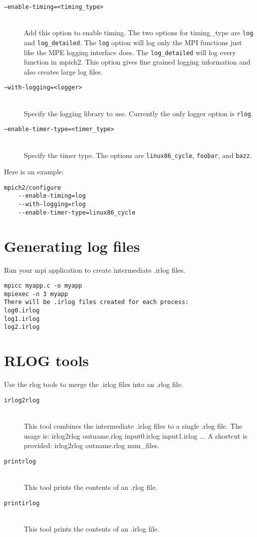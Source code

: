 \documentclass[dvipdfm,11pt]{article}
\begin{document}
\begin{description}
\item[\texttt{--enable-timing=<timing\_type>}]\mbox{}\\
Add this option to enable timing.  The two options for timing\_type are \texttt{log}
and \texttt{log\_detailed}.  The \texttt{log} option will log only the MPI functions just
like the MPE logging interface does.  The \texttt{log\_detailed} will log every
function in mpich2.  This option gives fine grained logging information and
also creates large log files.

\item[\texttt{--with-logging=<logger>}]\mbox{}\\
Specify the logging library to use.  Currently the only logger option is \texttt{rlog}.

\item[\texttt{--enable-timer-type=<timer\_type>}]\mbox{}\\
Specify the timer type.  The options are \texttt{linux86\_cycle}, \texttt{foobar}, and \texttt{bazz}.
\end{description}

Here is an example:
\begin{verbatim}
mpich2/configure
    --enable-timing=log
    --with-logging=rlog
    --enable-timer-type=linux86_cycle
\end{verbatim}

\section{Generating log files}
\label{sec:genlogs}
Run your mpi application to create intermediate .irlog files.

\begin{verbatim}
mpicc myapp.c -o myapp
mpiexec -n 3 myapp
There will be .irlog files created for each process:
log0.irlog
log1.irlog
log2.irlog
\end{verbatim}

\section{RLOG tools}
\label{sec:tools}
Use the rlog tools to merge the .irlog files into an .rlog file.

\begin{description}
\item[\texttt{irlog2rlog}]\mbox{}\\
This tool combines the intermediate .irlog files to a single .rlog file.
The usage is: irlog2rlog outname.rlog input0.irlog input1.irlog ...
A shortcut is provided: irlog2rlog outname.rlog num\_files.

\item[\texttt{printrlog}]\mbox{}\\
This tool prints the contents of an .rlog file.

\item[\texttt{printirlog}]\mbox{}\\
This tool prints the contents of an .irlog file.
\end{description}
\end{document}
